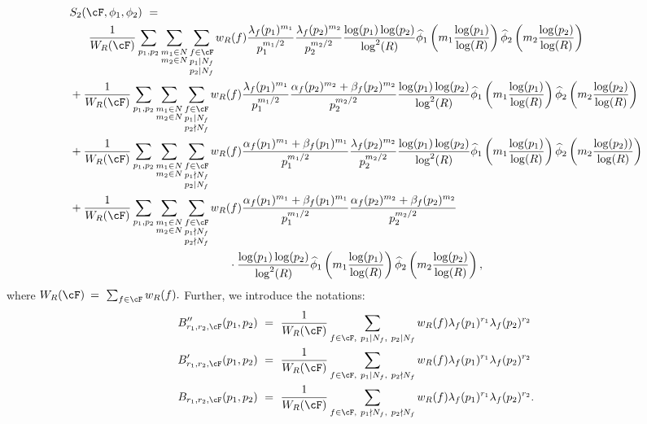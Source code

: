 \documentclass[11pt, reqno]{amsart}
\theoremstyle{definition}
\theoremstyle{remark}
\numberwithin{equation}{section}
\renewcommand{\hat}{\widehat}
\begin{document}
{\footnotesize\begin{align} \label{eq:S_2 formula}
    &S_2(\cF,\phi_1,\phi_2)\ = \ \notag\\ &~~~~~ \frac{1}{W_R(\cF)}\sum_{p_1,p_2}\sum_{\substack{m_1\in N\\m_2\in N}}\sum_{\substack{f\in \cF\\p_1|N_f\\p_2|N_f }}w_R(f)\frac{\lambda_f(p_1)^{m_1}}{p_1^{m_1/2}}  \frac{\lambda_f(p_2)^{m_2}}{p_2^{m_2/2}} \frac{\log(p_1)\log(p_2)}{\log^2(R)}\hat\phi_1 \left(m_1 \frac{\log(p_1)}{\log(R)}\right)\hat \phi_2 \left(m_2 \frac{\log(p_2)}{\log(R)}\right)\notag \\
    &+ \frac{1}{W_R(\cF)}\sum_{p_1,p_2}\sum_{\substack{m_1\in N\\m_2\in N}}\sum_{\substack{f\in \cF\\p_1|N_f\\p_2\nmid N_f }}w_R(f)\frac{\lambda_f(p_1)^{m_1}}{p_1^{m_1/2}}\frac{\alpha_f(p_2)^{m_2}+\beta_f(p_2)^{m_2}}{p_2^{m_2/2}} \frac{\log(p_1)\log(p_2)}{\log^2(R)}\hat\phi_1 \left(m_1 \frac{\log(p_1)}{\log(R)}\right)\hat \phi_2 \left(m_2 \frac{\log(p_2)}{\log(R)}\right)  \notag\\
    &+ \frac{1}{W_R(\cF)}\sum_{p_1,p_2}\sum_{\substack{m_1\in N\\m_2\in N}}\sum_{\substack{f\in \cF\\p_1\nmid N_f\\p_2|N_f }}w_R(f)\frac{\alpha_f(p_1)^{m_1}+\beta_f(p_1)^{m_1}}{p_1^{m_1/2}} \frac{\lambda_f(p_2)^{m_2}}{p_2^{m_2/2}}\frac{\log(p_1)\log(p_2)}{\log^2(R)}\hat\phi_1 \left(m_1 \frac{\log(p_1)}{\log(R)}\right)\hat \phi_2 \left(m_2 \frac{\log(p_2))}{\log(R)}\right)\notag \\
    &+\frac{1}{W_R(\cF)}\sum_{p_1,p_2}\sum_{\substack{m_1\in N\\m_2\in N}}\sum_{\substack{f\in \cF\\p_1\nmid N_f\\p_2\nmid N_f }}w_R(f)\frac{\alpha_f(p_1)^{m_1}+\beta_f(p_1)^{m_1}}{p_1^{m_1/2}} \frac{\alpha_f(p_2)^{m_2}+\beta_f(p_2)^{m_2}}{p_2^{m_2/2}}\notag \\ &\qquad \qquad\qquad\qquad\qquad\qquad\qquad\cdot\frac{\log(p_1)\log (p_2)}{\log^2(R)}\hat\phi_1 \left(m_1 \frac{\log(p_1)}{\log(R)}\right)\hat \phi_2 \left(m_2 \frac{\log(p_2)}{\log(R)}\right),
\end{align}}\normalsize where $W_R(\cF)\:= \ \sum_{f\in \cF} w_R(f).$
Further, we introduce the notations:
\begin{align}\label{not:B'' i,j}
    B''_{r_1,r_2,\cF}(p_1,p_2)&\ = \ \frac{1}{W_R(\cF)}\sum_{f \in \cF,~p_1| N_f,~p_2 | N_f} w_R(f) \lambda_f(p_1)^{r_1}\lambda_f(p_2)^{r_2} \\ \label{not:B' i,j}
     B'_{r_1,r_2,\cF}(p_1,p_2)&\ = \ \frac{1}{W_R(\cF)}\sum_{f \in \cF,~p_1| N_f,~p_2 \nmid N_f} w_R(f) \lambda_f(p_1)^{r_1}\lambda_f(p_2)^{r_2}\\\label{not:B i,j}
     B_{r_1,r_2,\cF}(p_1,p_2)&\ = \ \frac{1}{W_R(\cF)}\sum_{f \in \cF,~p_1\nmid N_f,~p_2 \nmid N_f} w_R(f) \lambda_f(p_1)^{r_1}\lambda_f(p_2)^{r_2}.
\end{align}\normalsize
\end{document}
